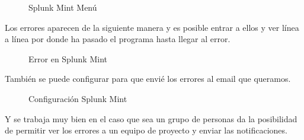 \begin{figure}[H] 
  \begin{center} 
    \caption{Splunk Mint Menú} 
    \label{fig:SplunkMintMenu} 
  \end{center} 
\end{figure}

Los errores aparecen de la siguiente manera y es posible entrar a ellos y ver línea a línea por donde ha pasado el programa hasta llegar al error.

\begin{figure}[H] 
  \begin{center} 
    \caption{Error en Splunk Mint} 
    \label{fig:ErrorSplunkMint} 
  \end{center} 
\end{figure}

También se puede configurar para que envié los errores al email que queramos.

\begin{figure}[H] 
  \begin{center} 
    \caption{Configuración  Splunk Mint} 
    \label{fig:ConfiguracionSplunkMint} 
  \end{center} 
\end{figure}

Y se trabaja muy bien en el caso que sea un grupo de personas da la posibilidad de permitir ver los errores a un equipo de proyecto y enviar las notificaciones.

